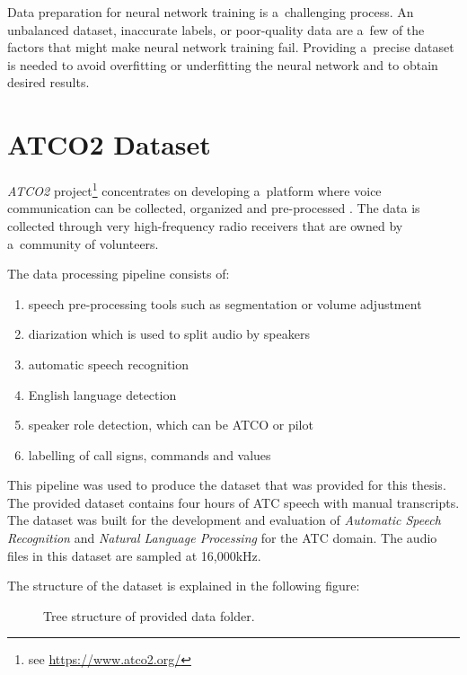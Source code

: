     Data preparation for neural network training is a~challenging process. An unbalanced dataset, inaccurate labels, or poor-quality data are a~few of the factors that might make neural network training fail. Providing a~precise dataset is needed to avoid overfitting or underfitting the neural network and to obtain desired results.
    
    
\section{ATCO2 Dataset}\label{Dataset}

    \textit{ATCO2} project\footnote{see \href{https://www.atco2.org/}{{\selectfont https://www.atco2.org/}}} concentrates on developing a~platform where voice communication can be collected, organized and pre-processed \cite{zeytinoglu2008voice}. The data is collected through very high-frequency radio receivers that are owned by a~community of volunteers.
    
    \vspace{0.2cm}
    
    The data processing pipeline consists of:
    \begin{enumerate}
        \item speech pre-processing tools such as segmentation or volume adjustment
        \item diarization which is used to split audio by speakers
        \item automatic speech recognition
        \item English language detection
        \item speaker role detection, which can be ATCO or pilot
        \item labelling of call signs, commands and values
    \end{enumerate}

    This pipeline was used to produce the dataset that was provided for this thesis. The provided dataset contains four hours of ATC speech with manual transcripts.
    The dataset was built for the development and evaluation of \textit{Automatic Speech Recognition} and \textit{Natural Language Processing} for the ATC domain. The audio files in this dataset are sampled at 16,000kHz. 


    \newpage
    The structure of the dataset is explained in the following figure:

    \begin{figure}[ht!]
    \caption{Tree structure of provided data folder.}
    \label{fig:ATCO_Structure}
    \end{figure}
    

